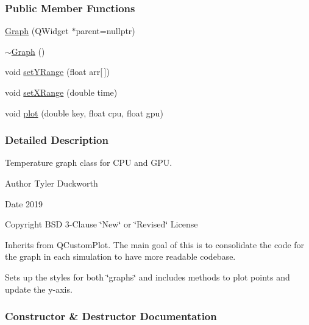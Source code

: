 \subsubsection*{Public Member Functions}
\begin{DoxyCompactItemize}
\item 
\mbox{\hyperlink{classGraph_a300165322c32ba400d3ad41a0a3628be}{Graph}} (Q\+Widget $\ast$parent=nullptr)
\item 
\mbox{\hyperlink{classGraph_a902c5b3eacb66d60752525ab23297a95}{$\sim$\+Graph}} ()
\item 
void \mbox{\hyperlink{classGraph_afdcfe2e0de63e5426fc20599304f7e8b}{set\+Y\+Range}} (float arr\mbox{[}$\,$\mbox{]})
\item 
void \mbox{\hyperlink{classGraph_a97336e2519fa9d0482a3f6cd604d9f72}{set\+X\+Range}} (double time)
\item 
void \mbox{\hyperlink{classGraph_ae5b5a135d83ce82c768e4e337ddfb520}{plot}} (double key, float cpu, float gpu)
\end{DoxyCompactItemize}


\subsubsection{Detailed Description}
Temperature graph class for C\+PU and G\+PU. 

\begin{DoxyAuthor}{Author}
Tyler Duckworth 
\end{DoxyAuthor}
\begin{DoxyDate}{Date}
2019 
\end{DoxyDate}
\begin{DoxyCopyright}{Copyright}
B\+SD 3-\/Clause \char`\"{}\+New\char`\"{} or \char`\"{}\+Revised\char`\"{} License
\end{DoxyCopyright}
Inherits from Q\+Custom\+Plot. The main goal of this is to consolidate the code for the graph in each simulation to have more readable codebase.

Sets up the styles for both \char`\"{}graphs\char`\"{} and includes methods to plot points and update the y-\/axis. 

\subsubsection{Constructor \& Destructor Documentation}
\mbox{\label{classGraph_a300165322c32ba400d3ad41a0a3628be}} 
